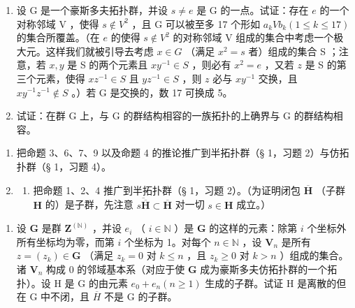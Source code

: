 \begin{enumerate}
\def\labelenumi{\arabic{enumi})}
\setcounter{enumi}{7}
\item
设 G 是一个豪斯多夫拓扑群，并设 \(s \neq e\) 是 G 的一点。试证：存在 \(e\) 的一个对称邻域 V ，使得 \(s \notin V^2\) ，且 G 可以被至多 17 个形如 \(a_k V b_k (1 \leqslant k \leqslant 17)\) 的集合所覆盖。（在 \(e\) 的使得 \(s \notin V^2\) 的对称邻域 V 组成的集合中考虑一个极大元。这样我们就被引导去考虑 \(x \in G\) （满足 \(x^2 = s\) 者）组成的集合 S ；注意，若 \(x, y\) 是 S 的两个元素且 \(xy^{-1} \in S\) ，则必有 \(x^2 = e\) ，又若 \(z\) 是 S 的第三个元素，使得 \(xz^{-1} \in S\) 且 \(yz^{-1} \in S\) ，则 \(z\) 必与 \(xy^{-1}\) 交换，且 \(xy^{-1}z^{-1} \notin S\) 。）若 G 是交换的，数 17 可换成 5。
\item
  试证：在群 G 上，与 G 的群结构相容的一族拓扑的上确界与 G 的群结构相容。
\end{enumerate}

\BourbakiExerciseGroup

\begin{enumerate}
\def\labelenumi{\arabic{enumi})}
\item
  把命题 3、6、7、9 以及命题 4 的推论推广到半拓扑群（§ 1，习题 2）与仿拓扑群（§ 1，习题 4）。
\item
  \begin{enumerate}
  \def\labelenumii{\alph{enumii})}
  \tightlist
  \item
    把命题 1、2、4 推广到半拓扑群（§ 1，习题 2）。（为证明闭包 \(\overline{\mathbf{H}}\) （子群 \(\mathbf{H}\) 的）是子群，先注意 \(\overline{s\overline{\mathbf{H}}} \subset \overline{\mathbf{H}}\) 对一切 \(s \in \mathbf{H}\) 成立。）
  \end{enumerate}
\end{enumerate}

\begin{enumerate}
\def\labelenumi{\alph{enumi})}
\setcounter{enumi}{1}
\tightlist
\item
  设 \(\mathbf{G}\) 是群 \(\mathbf{Z}^{(\mathbb{N})}\) ，并设 \(e_i\) （ \(i \in \mathbb{N}\) ）是 \(\mathbf{G}\) 的这样的元素：除第 \(i\) 个坐标外所有坐标均为零，而第 \(i\) 个坐标为 1。对每个 \(n \in \mathbb{N}\) ，设 \(\mathbf{V}_n\) 是所有 \(z = (z_k) \in \mathbf{G}\) （满足 \(z_k = 0\) 对 \(k \leqslant n\) ，且 \(z_k \geqslant 0\) 对 \(k > n\) ）组成的集合。诸 \(\mathbf{V}_n\) 构成 \(0\) 的邻域基本系（对应于使 \(\mathbf{G}\) 成为豪斯多夫仿拓扑群的一个拓扑）。设 H 是 G 的由元素 \(e_{0} + e_{n} (n \geqslant 1)\) 生成的子群。试证 H 是离散的但在 G 中不闭，且 \(\overline{H}\) 不是 G 的子群。
\end{enumerate}


